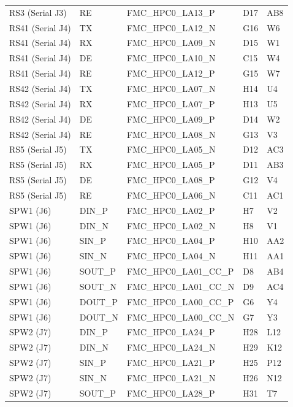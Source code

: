 {\begin{longtable}{lllll}
    RS3 (Serial J3) & RE & FMC\_HPC0\_LA13\_P & D17 & AB8 \\
    RS41 (Serial J4) & TX & FMC\_HPC0\_LA12\_N & G16 & W6 \\
    RS41 (Serial J4) & RX & FMC\_HPC0\_LA09\_N & D15 & W1 \\
    RS41 (Serial J4) & DE & FMC\_HPC0\_LA10\_N & C15 & W4 \\
    RS41 (Serial J4) & RE & FMC\_HPC0\_LA12\_P & G15 & W7 \\
    RS42 (Serial J4) & TX & FMC\_HPC0\_LA07\_N & H14 & U4 \\
    RS42 (Serial J4) & RX & FMC\_HPC0\_LA07\_P & H13 & U5 \\
    RS42 (Serial J4) & DE & FMC\_HPC0\_LA09\_P & D14 & W2 \\
    RS42 (Serial J4) & RE & FMC\_HPC0\_LA08\_N & G13 & V3 \\
    RS5 (Serial J5) & TX & FMC\_HPC0\_LA05\_N & D12 & AC3 \\
    RS5 (Serial J5) & RX & FMC\_HPC0\_LA05\_P & D11 & AB3 \\
    RS5 (Serial J5) & DE & FMC\_HPC0\_LA08\_P & G12 & V4 \\
    RS5 (Serial J5) & RE & FMC\_HPC0\_LA06\_N & C11 & AC1 \\
    SPW1 (J6) & DIN\_P & FMC\_HPC0\_LA02\_P & H7 & V2 \\
    SPW1 (J6) & DIN\_N & FMC\_HPC0\_LA02\_N & H8 & V1 \\
    SPW1 (J6) & SIN\_P & FMC\_HPC0\_LA04\_P & H10 & AA2 \\
    SPW1 (J6) & SIN\_N & FMC\_HPC0\_LA04\_N & H11 & AA1 \\
    SPW1 (J6) & SOUT\_P & FMC\_HPC0\_LA01\_CC\_P & D8 & AB4 \\
    SPW1 (J6) & SOUT\_N & FMC\_HPC0\_LA01\_CC\_N & D9 & AC4 \\
    SPW1 (J6) & DOUT\_P & FMC\_HPC0\_LA00\_CC\_P & G6 & Y4 \\
    SPW1 (J6) & DOUT\_N & FMC\_HPC0\_LA00\_CC\_N & G7 & Y3 \\
    SPW2 (J7) & DIN\_P & FMC\_HPC0\_LA24\_P & H28 & L12 \\
    SPW2 (J7) & DIN\_N & FMC\_HPC0\_LA24\_N & H29 & K12 \\
    SPW2 (J7) & SIN\_P & FMC\_HPC0\_LA21\_P & H25 & P12 \\
    SPW2 (J7) & SIN\_N & FMC\_HPC0\_LA21\_N & H26 & N12 \\
    SPW2 (J7) & SOUT\_P & FMC\_HPC0\_LA28\_P & H31 & T7 \\

\end{longtable}}
